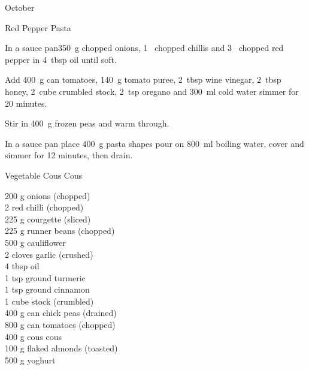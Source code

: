 \begin{menu}{October}
\begin{recipe}{2}{Red Pepper Pasta}
    \begin{instructions}
    \item 
        In a sauce pan350~g chopped onions,
        1~ chopped chillis
        and
        3~ chopped red pepper
        in
        4~tbsp  oil
        until soft.
      \item 
        Add
        400~g  can tomatoes,
        140~g  tomato puree,
        2~tbsp  wine vinegar,
        2~tbsp  honey,
        2~cube crumbled stock,
        2~tsp  oregano
        and
        300~ml  cold water
        simmer for 20 minutes.
      \item 
        Stir in
        400~g  frozen peas
        and warm through.
      \item 
    In a
    sauce pan
    place
    400~g  pasta shapes
    pour on
    800~ml  boiling water,
    cover and simmer for 12 minutes, then drain.
  
    \end{instructions}
    \end{recipe}%
  
    \begin{recipe}{2}{Vegetable Cous Cous}%
		\begin{ingredients}
		200 g onions (chopped) \\
	2  red chilli (chopped) \\
	225 g courgette (sliced) \\
	225 g runner beans (chopped) \\
	500 g cauliflower  \\
	2 cloves garlic (crushed) \\
	4 tbsp oil  \\
	1 tsp ground turmeric  \\
	1 tsp ground cinnamon  \\
	1 cube stock (crumbled) \\
	400 g can chick peas (drained) \\
	800 g can tomatoes (chopped) \\
	400 g cous cous  \\
	100 g flaked almonds (toasted) \\
	500 g yoghurt  \\
	
		\end{ingredients}
	
	

\end{recipe}
\end{menu}
